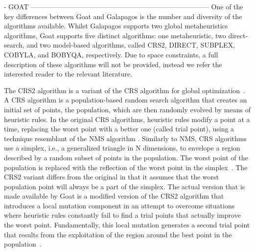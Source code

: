 - GOAT ------------------------------------------------------------------------------
One of the key differences between Goat and Galapagos is the number and diversity of the algorithms available. Whilst Galapagos supports two global metaheuristics algorithms, Goat supports five distinct algorithms: one metaheuristic, two direct-search, and two model-based algorithms, called CRS2, DIRECT, SUBPLEX, COBYLA, and BOBYQA, respectively. Due to space constraints, a full description of these algorithms will not be provided, instead we refer the interested reader to the relevant literature.  

The CRS2 algorithm is a variant of the \ac{CRS} algorithm for global optimization~\cite{Price1983}. A \ac{CRS} algorithm is a population-based random search algorithm that creates an initial set of points, the population, which are then randomly evolved by means of heuristic rules. In the original \ac{CRS} algorithms, heuristic rules modify a point at a time, replacing the worst point with a better one (called trial point), using a technique resemblant of the \ac{NMS} algorithm \cite{Nelder1964}. Similarly to \ac{NMS}, \ac{CRS} algorithms use a simplex, i.e., a generalized triangle in N dimensions, to envelope a region described by a random subset of points in the population. The worst point of the population is replaced with the reflection of the worst point in the simplex~\cite{Kaelo2006CRS2}. The CRS2 variant differs from the original in that it assumes that the worst population point will always be a part of the simplex. The actual version that is made available by Goat is a modified version of the CRS2 algorithm that introduces a local mutation component in an attempt to overcome situations where heuristic rules constantly fail to find a trial points that actually improve the worst point. Fundamentally, this local mutation generates a second trial point that results from the exploitation of the region around the best point in the population~\cite{Kaelo2006CRS2}.  


